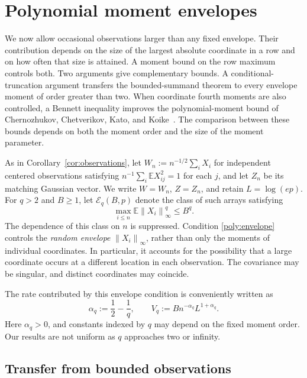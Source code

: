 \documentclass[11pt,letterpaper]{article}
\theoremstyle{remark}
\newcommand{\E}{\mathbb E}
\newcommand{\norm}[1]{\left\lVert#1\right\rVert}
\begin{document}
\section{Polynomial moment envelopes}\label{sec:poly}

We now allow occasional observations larger than any fixed envelope.
Their contribution depends on the size of the largest absolute
coordinate in a row and on how often that size is attained. A moment
bound on the row maximum controls both. Two arguments give complementary bounds. A
conditional-truncation argument transfers the bounded-summand theorem
to every envelope moment of order greater than two. When coordinate
fourth moments are also controlled, a Bennett inequality improves the
polynomial-moment bound of Chernozhukov, Chetverikov, Kato, and
Koike~\cite{CCKK2022}. The comparison between these bounds depends on
both the moment order and the size of the moment parameter.

As in Corollary~\ref{cor:observations}, let \(W_n:=n^{-1/2}\sum_iX_i\)
for independent centered observations satisfying
\(n^{-1}\sum_i\E X_{ij}^2=1\) for each \(j\), and let \(Z_n\) be its matching Gaussian vector. We write
\(W=W_n\), \(Z=Z_n\), and retain \(L=\log(ep)\).
For \(q>2\) and \(B\ge1\), let \(\mathcal E_q(B,p)\) denote the class
of such arrays satisfying
\begin{equation}
 \max_{i\le n}\E\norm{X_i}_\infty^q\le B^q.
 \label{poly:envelope}
\end{equation}
The dependence of this class on \(n\) is suppressed. Condition
\eqref{poly:envelope} controls the \emph{random envelope}
\(\norm{X_i}_\infty\), rather than only the moments of individual
coordinates. In particular, it accounts for the possibility that a
large coordinate occurs at a different location in each observation.
The covariance may be singular, and distinct coordinates may coincide.

The rate contributed by this envelope condition is conveniently written
as
\begin{equation}
 \alpha_q:=\frac12-\frac1q,\qquad
 V_q:=Bn^{-\alpha_q}L^{1+\alpha_q}.
 \label{poly:rates}
\end{equation}
Here \(\alpha_q>0\), and constants indexed by \(q\) may depend on the
fixed moment order. Our results are not uniform as \(q\) approaches two
or infinity.

\subsection{Transfer from bounded observations}\label{poly:transfer-sec}
\end{document}
